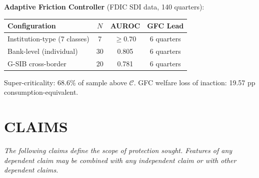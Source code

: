 \documentclass[12pt,a4paper]{article}
\begin{document}
\textbf{Adaptive Friction Controller} (FDIC SDI data, 140 quarters):
\begin{center}
\begin{tabular}{lccc}
\toprule
\textbf{Configuration} & $N$ & \textbf{AUROC} & \textbf{GFC Lead}\\
\midrule
Institution-type (7 classes) & 7 & $\geq0.70$ & 6 quarters \\
Bank-level (individual) & 30 & 0.805 & 6 quarters \\
G-SIB cross-border & 20 & 0.781 & 6 quarters \\
\bottomrule
\end{tabular}
\end{center}
Super-criticality: 68.6\% of sample above $\mathcal{C}$.
GFC welfare loss of inaction: 19.57 pp consumption-equivalent.

\clearpage
\section{CLAIMS}

\noindent\textit{The following claims define the scope of protection
sought. Features of any dependent claim may be combined with any
independent claim or with other dependent claims.}
\vspace{0.8em}
\end{document}
